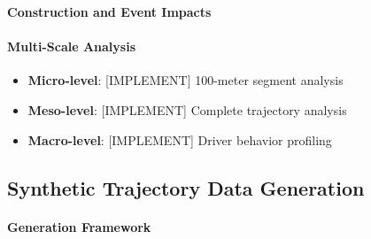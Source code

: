 \documentclass[runningheads]{llncs}
\begin{document}
\textbf{Construction and Event Impacts}

\paragraph{Multi-Scale Analysis}
\begin{itemize}
\item \textbf{Micro-level}: [IMPLEMENT] 100-meter segment analysis
\item \textbf{Meso-level}: [IMPLEMENT] Complete trajectory analysis  
\item \textbf{Macro-level}: [IMPLEMENT] Driver behavior profiling
\end{itemize}


\subsection{Synthetic Trajectory Data Generation}
\label{sec:synthetic}


\paragraph{Generation Framework}
\end{document}
